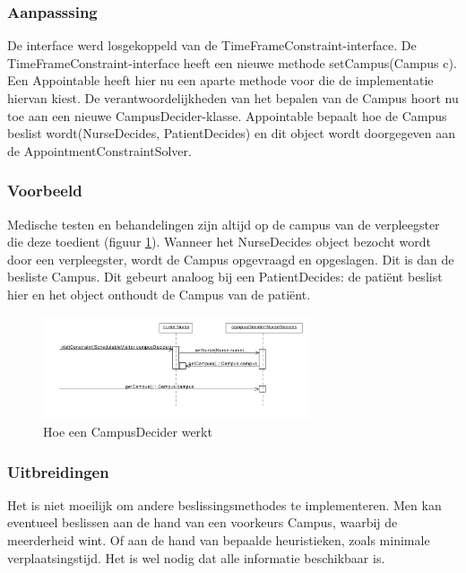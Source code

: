 \subsubsection{Aanpasssing}
De interface werd losgekoppeld van de TimeFrameConstraint-interface. 
De TimeFrameConstraint-interface heeft een nieuwe methode setCampus(Campus c). 
Een Appointable heeft hier nu een aparte methode voor die de implementatie hiervan kiest. 
De verantwoordelijkheden van het bepalen van de Campus hoort nu toe aan een nieuwe CampusDecider-klasse.
Appointable bepaalt hoe de Campus beslist wordt(NurseDecides, PatientDecides) en dit object wordt doorgegeven aan de AppointmentConstraintSolver. 

\subsubsection{Voorbeeld}
Medische testen en behandelingen zijn altijd op de campus van de verpleegster die deze toedient (figuur \ref{fig:nurseDecides}). 
Wanneer het NurseDecides object bezocht wordt door een verpleegster, wordt de Campus opgevraagd en opgeslagen. 
Dit is dan de besliste Campus. Dit gebeurt analoog bij een PatientDecides: de patiënt beslist hier en het object onthoudt de Campus van de patiënt.

\begin{figure}
 \centering
 \includegraphics[width=0.7\textwidth]{./exported/interaction/nurseDecides.pdf}
 \caption{Hoe een CampusDecider werkt\label{fig:nurseDecides}}
\end{figure}

\subsubsection{Uitbreidingen}
Het is niet moeilijk om andere beslissingsmethodes te implementeren. 
Men kan eventueel beslissen aan de hand van een voorkeurs Campus, waarbij de meerderheid wint. 
Of aan de hand van bepaalde heuristieken, zoals minimale verplaatsingstijd.
Het is wel nodig dat alle informatie beschikbaar is.

